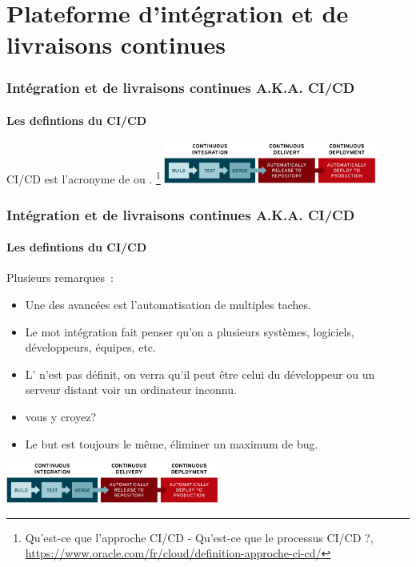 \documentclass{beamer}
\begin{document}
    \section{Plateforme d’intégration et de livraisons continues}\label{sec:plateforme-dintegration-et-de-livraisons-continues}

    \begin{frame}
        \frametitle{Intégration et de livraisons continues A.K.A. CI/CD}
        \framesubtitle{Les defintions du CI/CD}
        \transdissolve
        CI/CD est l'acronyme de  ou .
        \bigbreak
        \footnote{Qu'est-ce que l'approche CI/CD - Qu’est-ce que le processus CI/CD ?, \url{https://www.oracle.com/fr/cloud/definition-approche-ci-cd/}}
        \bigbreak
        \centering
        \includegraphics[width=7cm]{image/ci-cd-flow.png}
    \end{frame}

    \begin{frame}
        \frametitle{Intégration et de livraisons continues A.K.A. CI/CD}
        \framesubtitle{Les defintions du CI/CD}
        \transdissolve
        Plusieurs remarques~:
        \begin{itemize}
            \item Une des avancées est l'automatisation de multiples taches.
            \item Le mot intégration fait penser qu'on a plusieurs systèmes, logiciels, développeurs, équipes, etc.
            \item L' n'est pas définit, on verra qu'il peut être celui du développeur ou un serveur distant voir un ordinateur inconnu.
            \item {} vous y croyez?
            \item Le but est toujours le même, éliminer un maximum de bug.
        \end{itemize}
        \bigbreak
        \centering
        \includegraphics[width=7cm]{image/ci-cd-flow.png}
    \end{frame}
\end{document}
